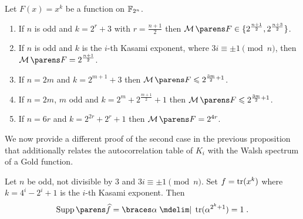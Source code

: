 \begin{proposition}
    Let $F(x)=x^k$ be a function on $\mathbb{F}_{2^n}$.
    \begin{enumerate}
        \item If $n$ is odd and $k=2^r+3$ with $r=\frac{n+1}{2}$ then $\absoluteindicator{F}\in \{2^\frac{n+1}{2},2^\frac{n+3}{2}\}$.
        \item If $n$ is odd and $k$ is the $i$-th Kasami exponent, where $3i \equiv \pm 1 \pmod n$, then $\absoluteindicator{F}=2^\frac{n+1}{2}$.
        \item If $n=2m$ and $k=2^{m+1}+3$ then $\absoluteindicator{F}\leqslant 2^{\frac{3m}{2}+1}$.
        \item If $n=2m$, $m$ odd and $k=2^{m}+2^{\frac{m+1}{2}}+1$ then $\absoluteindicator{F}\leqslant 2^{\frac{3m}{2}+1}$.
        \item If $n=6r$ and $k=2^{2r}+2^r+1$ then $\absoluteindicator{F}=2^{4r}$.
    \end{enumerate}
\end{proposition}

We now provide a different proof of the second case in the previous proposition that additionally relates the autocorrelation table of $K_i$ with the Walsh spectrum of a Gold function.

\begin{proposition}\label{thm:support}
    Let $n$ be odd, not divisible by $3$ and $3i \equiv \pm 1 \pmod n$.
    Set $f=\operatorname{tr}(x^k)$ where $k=4^i-2^i+1$ is the $i$-th Kasami exponent.
    Then
    \begin{equation*}
        \supp{\FC{f}} = \set{\alpha \given \tr(\alpha^{2^k+1})=1}\;.
    \end{equation*}
\end{proposition}

